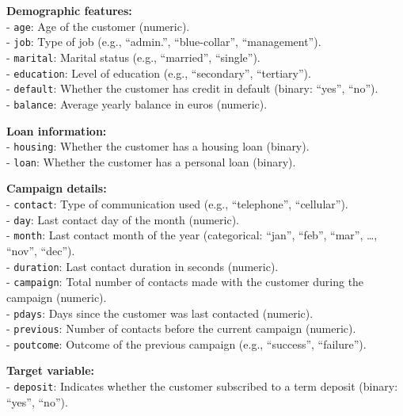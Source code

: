 \documentclass[
]{book}
\newcommand{\passthrough}[1]{#1}
\theoremstyle{definition}
\theoremstyle{definition}
\theoremstyle{definition}
\theoremstyle{definition}
\theoremstyle{remark}
\begin{document}
\textbf{Demographic features:}\\
- \passthrough{\lstinline!age!}: Age of the customer (numeric).\\
- \passthrough{\lstinline!job!}: Type of job (e.g., ``admin.'', ``blue-collar'', ``management'').\\
- \passthrough{\lstinline!marital!}: Marital status (e.g., ``married'', ``single'').\\
- \passthrough{\lstinline!education!}: Level of education (e.g., ``secondary'', ``tertiary'').\\
- \passthrough{\lstinline!default!}: Whether the customer has credit in default (binary: ``yes'', ``no'').\\
- \passthrough{\lstinline!balance!}: Average yearly balance in euros (numeric).

\textbf{Loan information:}\\
- \passthrough{\lstinline!housing!}: Whether the customer has a housing loan (binary).\\
- \passthrough{\lstinline!loan!}: Whether the customer has a personal loan (binary).

\textbf{Campaign details:}\\
- \passthrough{\lstinline!contact!}: Type of communication used (e.g., ``telephone'', ``cellular'').\\
- \passthrough{\lstinline!day!}: Last contact day of the month (numeric).\\
- \passthrough{\lstinline!month!}: Last contact month of the year (categorical: ``jan'', ``feb'', ``mar'', \ldots, ``nov'', ``dec'').\\
- \passthrough{\lstinline!duration!}: Last contact duration in seconds (numeric).\\
- \passthrough{\lstinline!campaign!}: Total number of contacts made with the customer during the campaign (numeric).\\
- \passthrough{\lstinline!pdays!}: Days since the customer was last contacted (numeric).\\
- \passthrough{\lstinline!previous!}: Number of contacts before the current campaign (numeric).\\
- \passthrough{\lstinline!poutcome!}: Outcome of the previous campaign (e.g., ``success'', ``failure'').

\textbf{Target variable:}\\
- \passthrough{\lstinline!deposit!}: Indicates whether the customer subscribed to a term deposit (binary: ``yes'', ``no'').
\end{document}

